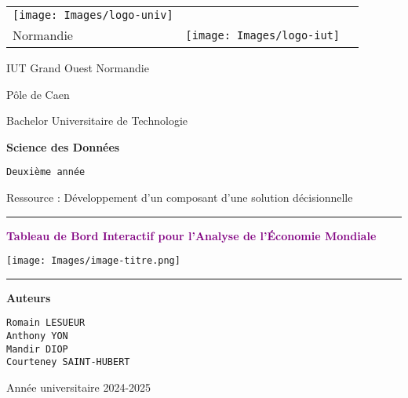 \documentclass[11pt]{article}
\begin{document}
\thispagestyle{empty}


\begin{tabular}{m{}m{}m{} }
\texttt{[image: Images/logo-univ]} & \centering {\fontsize{22}{15}\selectfont \bf Université de Caen \\[0.3cm] Normandie}  & \texttt{[image: Images/logo-iut]}
\end{tabular}

\vspace{1cm}

\begin{center}
{\fontsize{24}{15}\selectfont IUT Grand Ouest Normandie}

\vspace{0.5cm}

{\LARGE Pôle de Caen}

\vspace{1.cm}

{\fontsize{20}{15}\selectfont Bachelor Universitaire de Technologie}

\vspace{0.4cm}

{\fontsize{20}{15}\selectfont \bf Science des Données}

\vspace{1.25cm}

{\Large \tt Deuxième année}

\vspace{0.3cm}

{\Large Ressource : Développement d’un composant d’une solution décisionnelle}

\vspace{1cm}

\rule{0.5\textwidth}{1pt}

\vspace{0.8cm}

{\fontsize{20}{15}\selectfont \textcolor{purple}{\bf Tableau de Bord Interactif pour l'Analyse de l'Économie Mondiale}}

\vspace{1cm}

\texttt{[image: Images/image-titre.png]}

\vspace{0.3cm}
 
\rule{0.5\textwidth}{1pt}

\vspace{0.3cm}

{\Large \bf Auteurs}

\vspace{0.1cm}

{\tt Romain LESUEUR}\\[0.2cm]
{\tt Anthony YON}\\[0.2cm]
{\tt Mandir DIOP}\\[0.2cm]
{\tt Courteney SAINT-HUBERT}

\vspace{1.7cm}

{\large Année universitaire 2024-2025}

\end{center}
\end{document}
